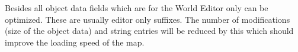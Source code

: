 \documentclass[a4paper,12pt,titlepage]{report}
\begin{document}
\vspace{\baselineskip}

Besides all object data fields which are for the World Editor only can be optimized. These are usually editor only suffixes. The number of modifications (size of the object data) and string entries will be reduced by this which should improve the loading speed of the map.

\newpage

\cleardoublepage
{}
{}
\listoffigures

\newpage

%

\cleardoublepage
{}
{}
\renewcommand\lstlistingname{Listings}
\renewcommand\lstlistlistingname{Listings}
\lstlistoflistings

\newpage

\setcounter{biburlnumpenalty}{9000}
\setcounter{biburlucpenalty}{9000}
\setcounter{biburllcpenalty}{9000}
\cleardoublepage
{}
{}
\printbibliography[title=Bibliography]
\end{document}
